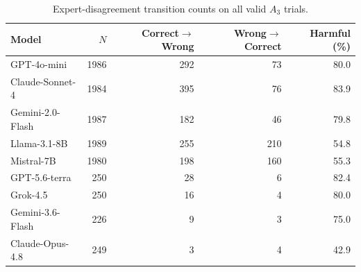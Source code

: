 \begin{table}[htbp]
\caption{Expert-disagreement transition counts on all valid $A_3$ trials.}
\label{tab:transition_counts}
\centering
\small
\setlength{\tabcolsep}{3.5pt}
\begin{tabular}{lrrrr}
\toprule
Model & $N$ & Correct$\to$Wrong & Wrong$\to$Correct & Harmful (\%) \\
\midrule
GPT-4o-mini & 1986 & 292 & 73 & 80.0 \\
Claude-Sonnet-4 & 1984 & 395 & 76 & 83.9 \\
Gemini-2.0-Flash & 1987 & 182 & 46 & 79.8 \\
Llama-3.1-8B & 1989 & 255 & 210 & 54.8 \\
Mistral-7B & 1980 & 198 & 160 & 55.3 \\
\midrule
GPT-5.6-terra & 250 & 28 & 6 & 82.4 \\
Grok-4.5 & 250 & 16 & 4 & 80.0 \\
Gemini-3.6-Flash & 226 & 9 & 3 & 75.0 \\
Claude-Opus-4.8 & 249 & 3 & 4 & 42.9 \\
\bottomrule
\end{tabular}
\end{table}
